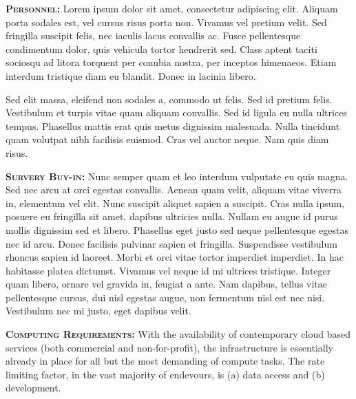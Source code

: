 \documentclass[oneside, a4paper, onecolumn, 11pt]{article}
\begin{document}
\smallskip
\smallskip
\noindent
\textbf{\textsc{Personnel:}} 
 Lorem ipsum dolor sit amet, consectetur adipiscing elit. Aliquam porta sodales est, vel cursus risus porta non. Vivamus vel pretium velit. Sed fringilla suscipit felis, nec iaculis lacus convallis ac. Fusce pellentesque condimentum dolor, quis vehicula tortor hendrerit sed. Class aptent taciti sociosqu ad litora torquent per conubia nostra, per inceptos himenaeos. Etiam interdum tristique diam eu blandit. Donec in lacinia libero.

\noindent
Sed elit massa, eleifend non sodales a, commodo ut felis. Sed id pretium felis. Vestibulum et turpis vitae quam aliquam convallis. Sed id ligula eu nulla ultrices tempus. Phasellus mattis erat quis metus dignissim malesuada. Nulla tincidunt quam volutpat nibh facilisis euismod. Cras vel auctor neque. Nam quis diam risus.

\smallskip
\smallskip
\noindent
\textbf{\textsc{Survery Buy-in:}} 
Nunc semper quam et leo interdum vulputate eu quis magna. Sed nec arcu at orci egestas convallis. Aenean quam velit, aliquam vitae viverra in, elementum vel elit. Nunc suscipit aliquet sapien a suscipit. Cras nulla ipsum, posuere eu fringilla sit amet, dapibus ultricies nulla. Nullam eu augue id purus mollis dignissim sed et libero. Phasellus eget justo sed neque pellentesque egestas nec id arcu. Donec facilisis pulvinar sapien et fringilla. Suspendisse vestibulum rhoncus sapien id laoreet. Morbi et orci vitae tortor imperdiet imperdiet. In hac habitasse platea dictumst. Vivamus vel neque id mi ultrices tristique. Integer quam libero, ornare vel gravida in, feugiat a ante. Nam dapibus, tellus vitae pellentesque cursus, dui nisl egestas augue, non fermentum nisl est nec nisi. Vestibulum nec mi justo, eget dapibus velit.

\smallskip
\smallskip
\noindent
\textbf{\textsc{Computing Requirements:}} 
With the availability of contemporary cloud based services (both
commercial and non-for-profit), the infrastructure is essentially
already in place for all but the most demanding of compute tasks. The
rate limiting factor, in the vast majority of endevours, is (a) data
access and (b) development.
\end{document}
